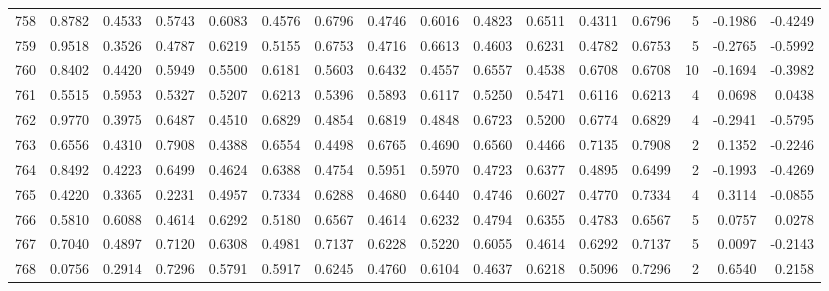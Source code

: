 \begin{tabular}{lrrrrrrrrrrrrrrr}
758 &      0.8782 &  0.4533 &  0.5743 &  0.6083 &  0.4576 &  0.6796 &  0.4746 &  0.6016 &  0.4823 &  0.6511 &   0.4311 &     0.6796 &      5 &                   -0.1986 &                    -0.4249 \\
759 &      0.9518 &  0.3526 &  0.4787 &  0.6219 &  0.5155 &  0.6753 &  0.4716 &  0.6613 &  0.4603 &  0.6231 &   0.4782 &     0.6753 &      5 &                   -0.2765 &                    -0.5992 \\
760 &      0.8402 &  0.4420 &  0.5949 &  0.5500 &  0.6181 &  0.5603 &  0.6432 &  0.4557 &  0.6557 &  0.4538 &   0.6708 &     0.6708 &     10 &                   -0.1694 &                    -0.3982 \\
761 &      0.5515 &  0.5953 &  0.5327 &  0.5207 &  0.6213 &  0.5396 &  0.5893 &  0.6117 &  0.5250 &  0.5471 &   0.6116 &     0.6213 &      4 &                    0.0698 &                     0.0438 \\
762 &      0.9770 &  0.3975 &  0.6487 &  0.4510 &  0.6829 &  0.4854 &  0.6819 &  0.4848 &  0.6723 &  0.5200 &   0.6774 &     0.6829 &      4 &                   -0.2941 &                    -0.5795 \\
763 &      0.6556 &  0.4310 &  0.7908 &  0.4388 &  0.6554 &  0.4498 &  0.6765 &  0.4690 &  0.6560 &  0.4466 &   0.7135 &     0.7908 &      2 &                    0.1352 &                    -0.2246 \\
764 &      0.8492 &  0.4223 &  0.6499 &  0.4624 &  0.6388 &  0.4754 &  0.5951 &  0.5970 &  0.4723 &  0.6377 &   0.4895 &     0.6499 &      2 &                   -0.1993 &                    -0.4269 \\
765 &      0.4220 &  0.3365 &  0.2231 &  0.4957 &  0.7334 &  0.6288 &  0.4680 &  0.6440 &  0.4746 &  0.6027 &   0.4770 &     0.7334 &      4 &                    0.3114 &                    -0.0855 \\
766 &      0.5810 &  0.6088 &  0.4614 &  0.6292 &  0.5180 &  0.6567 &  0.4614 &  0.6232 &  0.4794 &  0.6355 &   0.4783 &     0.6567 &      5 &                    0.0757 &                     0.0278 \\
767 &      0.7040 &  0.4897 &  0.7120 &  0.6308 &  0.4981 &  0.7137 &  0.6228 &  0.5220 &  0.6055 &  0.4614 &   0.6292 &     0.7137 &      5 &                    0.0097 &                    -0.2143 \\
768 &      0.0756 &  0.2914 &  0.7296 &  0.5791 &  0.5917 &  0.6245 &  0.4760 &  0.6104 &  0.4637 &  0.6218 &   0.5096 &     0.7296 &      2 &                    0.6540 &                     0.2158 \\

\end{tabular}
